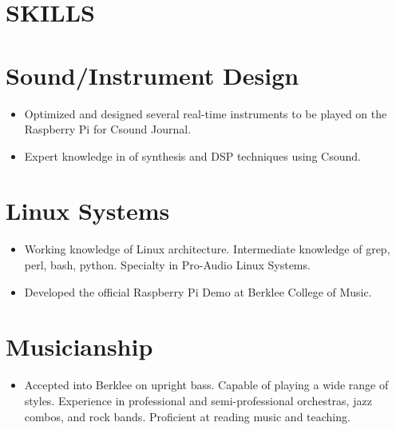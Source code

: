 \documentclass[margin]{res}
\begin{document}
\begin{resume}
\section{SKILLS} 
\normalsize{\section{Sound/Instrument Design}}
                 \begin{itemize}
                 \item Optimized and designed several real-time instruments to be
played on the Raspberry Pi for Csound Journal.
			  \item Expert knowledge in of synthesis and DSP techniques using Csound.
                 \end{itemize}
\normalsize{\section{Linux Systems}} 
                 \begin{itemize}
                  \item  Working knowledge of 
Linux architecture. Intermediate knowledge of grep, perl, bash, python. Specialty
in Pro-Audio Linux Systems.
			   \item Developed the official Raspberry Pi Demo at Berklee College
of Music.
                  \end{itemize}
\normalsize{\section{Musicianship}} 
                 \begin{itemize}
                  \item Accepted into Berklee on upright bass. Capable of playing
a wide range of styles. Experience in professional and semi-professional orchestras,
jazz combos, and rock bands. Proficient at reading music and teaching.
                  \end{itemize}


\end{resume}
\end{document}
